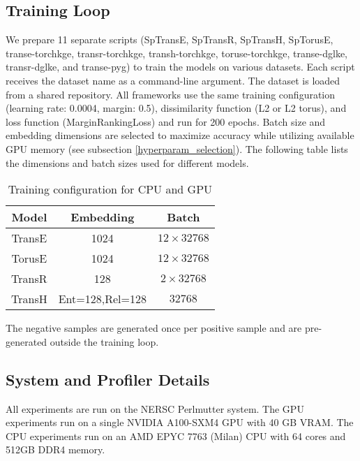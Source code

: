 \subsection{Training Loop}
We prepare 11 separate scripts (SpTransE, SpTransR, SpTransH, SpTorusE, transe-torchkge, transr-torchkge, transh-torchkge, toruse-torchkge, transe-dglke, transr-dglke, and transe-pyg) to train the models on various datasets. Each script receives the dataset name as a command-line argument. The dataset is loaded from a shared repository. All frameworks use the same training configuration (learning rate: 0.0004, margin: 0.5), dissimilarity function (L2 or L2 torus), and loss function (MarginRankingLoss) and run for 200 epochs. Batch size and embedding dimensions are selected to maximize accuracy while utilizing available GPU memory (see subsection \ref{hyperparam_selection}). The following table lists the dimensions and batch sizes used for different models. 

    \begin{table}[h]
\caption{Training configuration for CPU and GPU}
\label{table:trg-config}
\vskip 0.15in
\begin{center}
\begin{small}
\begin{sc}
\begin{tabular}{ccc}
\toprule
  Model  & Embedding       & Batch     \\
\midrule
TransE & 1024            & $12 \times 32768$ \\
TorusE & 1024            & $12 \times 32768$ \\
TransR & 128             & $2 \times 32768$  \\
TransH & Ent=128,Rel=128 & $32768$    \\    
\bottomrule
\end{tabular}
\end{sc}
\end{small}
\end{center}
\vskip -0.1in
\end{table}

The negative samples are generated once per positive sample and are pre-generated outside the training loop.

\subsection{System and Profiler Details}
All experiments are run on the NERSC Perlmutter system. The GPU experiments run on a single NVIDIA
A100-SXM4 GPU with 40 GB VRAM. The CPU experiments run on an AMD EPYC 7763 (Milan) CPU with 64 cores and 512GB DDR4 memory. 

